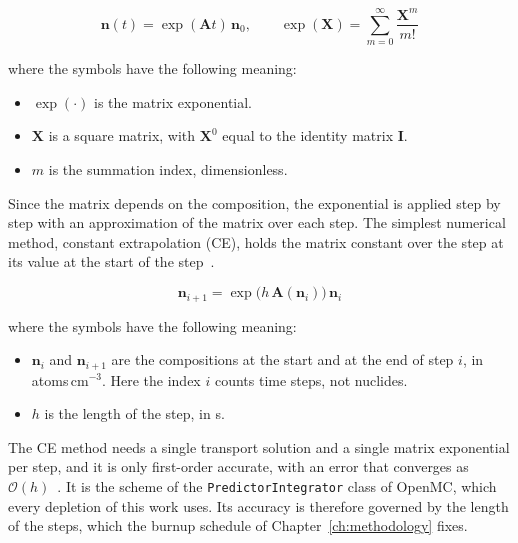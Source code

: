 \begin{equation}
\mathbf{n}(t) = \exp(\mathbf{A}t)\,\mathbf{n}_0,
\qquad
\exp(\mathbf{X}) = \sum_{m=0}^{\infty}\frac{\mathbf{X}^{m}}{m!}
\label{eq:mat-exp}
\end{equation}

\noindent where the symbols have the following meaning:

\begin{itemize}
  \item $\exp(\cdot)$ is the matrix exponential.

  \item $\mathbf{X}$ is a square matrix, with $\mathbf{X}^{0}$ equal to
        the identity matrix $\mathbf{I}$.

  \item $m$ is the summation index, dimensionless.
\end{itemize}

Since the matrix depends on the composition, the exponential is applied
step by step with an approximation of the matrix over each step. The
simplest numerical method, constant extrapolation (CE), holds the matrix
constant over the step at its value at the start of the
step~\cite{romano_2021_depletion}.

\begin{equation}
\mathbf{n}_{i+1} = \exp\!\big(h\,\mathbf{A}(\mathbf{n}_i)\big)\,\mathbf{n}_i
\label{eq:dep-ce}
\end{equation}

\noindent where the symbols have the following meaning:

\begin{itemize}
  \item $\mathbf{n}_i$ and $\mathbf{n}_{i+1}$ are the compositions at
        the start and at the end of step $i$, in atoms\,cm$^{-3}$. Here
        the index $i$ counts time steps, not nuclides.

  \item $h$ is the length of the step, in s.
\end{itemize}

The CE method needs a single transport solution and a single matrix
exponential per step, and it is only first-order accurate, with an error
that converges as $\mathcal{O}(h)$~\cite{romano_2021_depletion}. It is
the scheme of the \texttt{PredictorIntegrator} class of OpenMC, which
every depletion of this work uses. Its accuracy is therefore governed by
the length of the steps, which the burnup schedule of
Chapter~\ref{ch:methodology} fixes.

